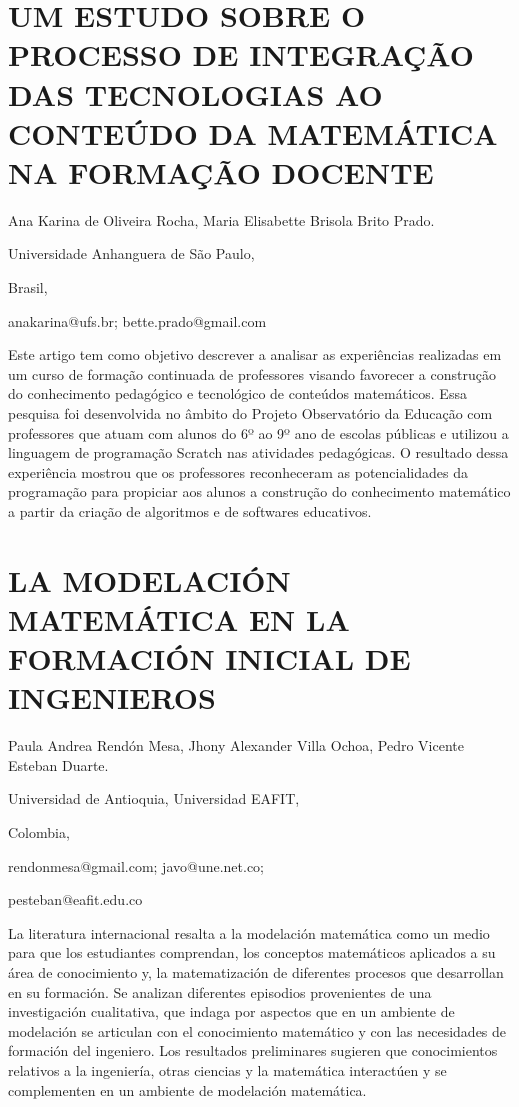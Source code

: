 \section{UM ESTUDO SOBRE O PROCESSO DE INTEGRAÇÃO DAS TECNOLOGIAS AO CONTEÚDO
DA MATEMÁTICA NA FORMAÇÃO DOCENTE}

\begin{datos}

Ana Karina de Oliveira Rocha, Maria Elisabette Brisola Brito Prado.

Universidade Anhanguera de São Paulo,

Brasil,

anakarina@ufs.br; bette.prado@gmail.com

\end{datos}

Este artigo tem como objetivo descrever a analisar as experiências
realizadas em um curso de formação continuada de professores visando
favorecer a construção do conhecimento pedagógico e tecnológico de
conteúdos matemáticos. Essa pesquisa foi desenvolvida no âmbito do
Projeto Observatório da Educação com professores que atuam com alunos
do 6º ao 9º ano de escolas públicas e utilizou a linguagem de programação
Scratch nas atividades pedagógicas. O resultado dessa experiência
mostrou que os professores reconheceram as potencialidades da programação
para propiciar aos alunos a construção do conhecimento matemático
a partir da criação de algoritmos e de softwares educativos.


\section{LA MODELACIÓN MATEMÁTICA EN LA FORMACIÓN INICIAL DE INGENIEROS}

\begin{datos}

Paula Andrea Rendón Mesa, Jhony Alexander Villa Ochoa, Pedro Vicente
Esteban Duarte.

Universidad de Antioquia, Universidad EAFIT,

Colombia,

rendonmesa@gmail.com; javo@une.net.co;

pesteban@eafit.edu.co

\end{datos}

La literatura internacional resalta a la modelación matemática como
un medio para que los estudiantes comprendan, los conceptos matemáticos
aplicados a su área de conocimiento y, la matematización de diferentes
procesos que desarrollan en su formación. Se analizan diferentes episodios
provenientes de una investigación cualitativa, que indaga por aspectos
que en un ambiente de modelación se articulan con el conocimiento
matemático y con las necesidades de formación del ingeniero. Los resultados
preliminares sugieren que conocimientos relativos a la ingeniería,
otras ciencias y la matemática interactúen y se complementen en un
ambiente de modelación matemática.


